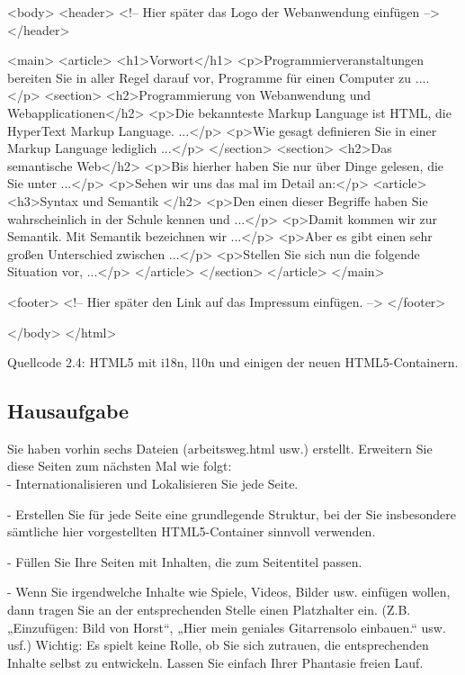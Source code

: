 <body> 
<header>
<!-- Hier später das Logo der Webanwendung einfügen -->
</header>

<main>
<article>
<h1>Vorwort</h1>
<p>Programmierveranstaltungen bereiten Sie in aller Regel darauf vor, Programme für einen Computer zu  ....</p> 
<section>
<h2>Programmierung von Webanwendung und Webapplicationen</h2>
<p>Die bekannteste Markup Language ist HTML, die HyperText Markup Language. ...</p>
<p>Wie gesagt definieren Sie in einer Markup Language lediglich  ...</p>
</section>
<section>
<h2>Das semantische Web</h2>
<p>Bis hierher haben Sie nur über Dinge gelesen, die Sie unter  ...</p>
<p>Sehen wir uns das mal im Detail an:</p>
<article>
<h3>Syntax und Semantik </h2>
<p>Den einen dieser Begriffe haben Sie wahrscheinlich in der Schule kennen und ...</p>
<p>Damit kommen wir zur Semantik. Mit Semantik bezeichnen wir ...</p>
<p>Aber es gibt einen sehr großen Unterschied zwischen  ...</p>
<p>Stellen Sie sich nun die folgende Situation vor, ...</p>
</article>
</section>
</article>
</main>

<footer>
<!-- Hier später den Link auf das Impressum einfügen. -->
</footer>

</body> 
</html>

Quellcode 2.4: HTML5 mit i18n, l10n und einigen der neuen HTML5-Containern.

\subsection{Hausaufgabe}

Sie haben vorhin sechs Dateien (arbeitsweg.html usw.) erstellt. Erweitern Sie diese Seiten zum nächsten Mal wie folgt:\\

-	Internationalisieren und Lokalisieren Sie jede Seite.

-	Erstellen Sie für jede Seite eine grundlegende Struktur, bei der Sie insbesondere sämtliche hier vorgestellten HTML5-Container sinnvoll verwenden.

-	Füllen Sie Ihre Seiten mit Inhalten, die zum Seitentitel passen.

-	Wenn Sie irgendwelche Inhalte wie Spiele, Videos, Bilder usw. einfügen wollen, dann tragen Sie an der entsprechenden Stelle einen Platzhalter ein. (Z.B. „Einzufügen: Bild von Horst“, „Hier mein geniales Gitarrensolo einbauen.“ usw. usf.) Wichtig: Es spielt keine Rolle, ob Sie sich zutrauen, die entsprechenden Inhalte selbst zu entwickeln. Lassen Sie einfach Ihrer Phantasie freien Lauf.

